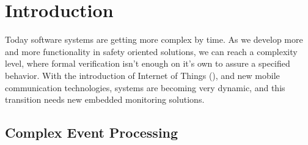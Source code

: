 \chapter{Introduction}
\label{chap:introduction}

Today software systems are getting more complex by time. As we develop more and more functionality in safety oriented solutions, we can reach a complexity level, where formal verification isn't enough on it's own to assure a specified behavior. With the introduction of Internet of Things (), and new mobile communication technologies, systems are becoming very dynamic, and this transition needs new embedded monitoring solutions.

\section{Complex Event Processing}

